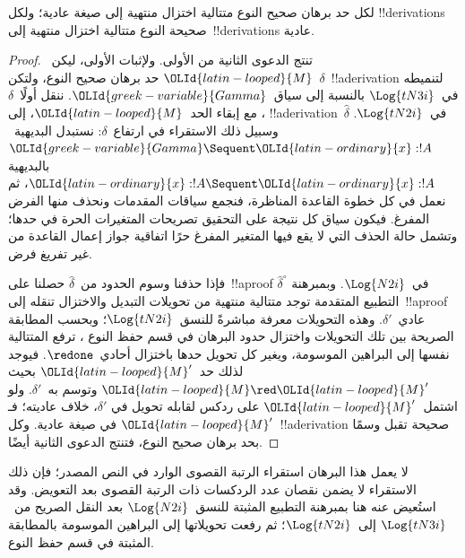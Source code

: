 \documentclass[../../../include/open-logic-section]{subfiles}
\begin{document}
\begin{thm}
  لكل حد برهان صحيح النوع متتالية اختزال منتهية إلى صيغة عادية؛ ولكل
  !!{derivation}s صحيحة النوع متتالية اختزال منتهية إلى~!!{derivation}s
  عادية.
\end{thm}

\begin{proof}
  تنتج الدعوى الثانية من الأولى. ولإثبات الأولى، ليكن~$\OLId{latin-looped}{M}$ حد برهان صحيح
  النوع، ولتكن~$\delta$~!!a{derivation} لتنميطه في~$\Log{tN3i}$ بالنسبة
  إلى سياق~$\OLId{greek-variable}{Gamma}$. ننقل أولًا~$\delta$، مع إبقاء الحد~$\OLId{latin-looped}{M}$، إلى
  !!a{derivation}~$\widehat\delta$ في~$\Log{tN2i}$. وسبيل ذلك الاستقراء في
  ارتفاع~$\delta$: نستبدل البديهية~$\OLId{greek-variable}{Gamma}\Sequent \OLId{latin-ordinary}{x}:!A$ بالبديهية
  $\OLId{latin-ordinary}{x}:!A\Sequent \OLId{latin-ordinary}{x}:!A$، ثم نعمل في كل خطوة القاعدة المناظرة، فنجمع سياقات
  المقدمات ونحذف منها الفرض المفرغ. فيكون سياق كل نتيجة على التحقيق
  تصريحات المتغيرات الحرة في حدها؛ وتشمل حالة الحذف التي لا يقع فيها
  المتغير المفرغ حرًا اتفاقية جواز إعمال القاعدة من غير تفريغ فرض.

  فإذا حذفنا وسوم الحدود من~$\widehat\delta$ حصلنا على~!!a{proof}
  $\widehat\delta^\circ$ في~$\Log{N2i}$. وبمبرهنة التطبيع المتقدمة
   توجد متتالية منتهية من
  تحويلات التبديل والاختزال تنقله إلى~!!a{proof} عادي~$\delta'$. وهذه
  التحويلات معرفة مباشرةً للنسق~$\Log{tN2i}$؛ وبحسب المطابقة الصريحة بين
  تلك التحويلات واختزال حدود البرهان في قسم حفظ النوع
  ، ترفع المتتالية نفسها إلى البراهين الموسومة،
  ويغير كل تحويل حدها باختزال أحادي~$\redone$. فيوجد لذلك حد~$\OLId{latin-looped}{M}'$ بحيث
  $\OLId{latin-looped}{M}\red \OLId{latin-looped}{M}'$ وتوسم به~$\delta'$. ولو اشتمل~$\OLId{latin-looped}{M}'$ على ردكس لقابله تحويل في
  $\delta'$، خلاف عاديته؛ فـ$\OLId{latin-looped}{M}'$ في صيغة عادية. وكل~!!a{derivation} صحيحة
  تقبل وسمًا بحد برهان صحيح النوع، فتنتج الدعوى الثانية أيضًا.
\end{proof}

\begin{editorial}
  لا يعمل هذا البرهان استقراء الرتبة القصوى الوارد في النص المصدر؛ فإن ذلك
  الاستقراء لا يضمن نقصان عدد الردكسات ذات الرتبة القصوى بعد التعويض. وقد
  استُعيض عنه هنا بمبرهنة التطبيع المثبتة للنسق~$\Log{N2i}$ بعد النقل
  الصريح من~$\Log{tN3i}$ إلى~$\Log{tN2i}$؛ ثم رفعت تحويلاتها إلى البراهين
  الموسومة بالمطابقة المثبتة في قسم حفظ النوع.
\end{editorial}
\end{document}

